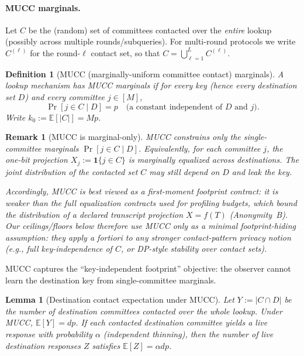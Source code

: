 \documentclass[11pt]{article}
\newtheorem{definition}{Definition}
\newtheorem{lemma}{Lemma}
\newtheorem{remark}{Remark}
\newcommand{\E}{\mathbb{E}}
\newcommand{\one}{\mathbf{1}}
\begin{document}
\paragraph{MUCC marginals.}
Let $C$ be the (random) set of committees contacted over the \emph{entire} lookup (possibly across multiple rounds/subqueries).
For multi-round protocols we write $C^{(\ell)}$ for the round-$\ell$ contact set, so that $C=\bigcup_{\ell=1}^L C^{(\ell)}$.

\begin{definition}[MUCC (marginally-uniform committee contact) marginals]
\label{def:mucc}
A lookup mechanism has \emph{MUCC marginals} if for every key (hence every destination set $D$) and every committee $j\in[M]$,
\[\Pr[j\in C\mid D] = p\quad\text{(a constant independent of $D$ and $j$)}.\]
Write $k_0 := \E[|C|] = Mp$.
\end{definition}

\begin{remark}[MUCC is marginal-only]
MUCC constrains only the \emph{single-committee} marginals $\Pr[j\in C\mid D]$.
Equivalently, for each committee $j$, the one-bit projection $X_j:=\one\{j\in C\}$ is marginally equalized across destinations.
The \emph{joint} distribution of the contacted set $C$ may still depend on $D$ and leak the key.

Accordingly, MUCC is best viewed as a \emph{first-moment footprint contract}:
it is weaker than the full equalization contracts used for profiling budgets, which bound the \emph{distribution} of a declared transcript projection $X=f(T)$ (Anonymity~B).\cite{series:profiling}
Our ceilings/floors below therefore use MUCC only as a \emph{minimal} footprint-hiding assumption:
they apply \emph{a fortiori} to any stronger contact-pattern privacy notion (e.g., full key-independence of $C$, or DP-style stability over contact sets).
\end{remark}

MUCC captures the ``key-independent footprint'' objective: the observer cannot learn the destination key from single-committee marginals.

\begin{lemma}[Destination contact expectation under MUCC]
\label{lem:mucc-dest-exp}
Let $Y:=|C\cap D|$ be the number of destination committees contacted over the whole lookup.
Under MUCC, $\E[Y]=dp$.
If each contacted destination committee yields a live response with probability $\alpha$ (independent thinning), then the number of live destination responses $Z$ satisfies $\E[Z]=\alpha dp$.
\end{lemma}
\end{document}
